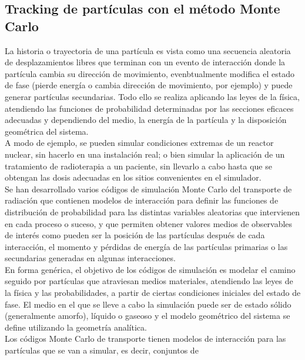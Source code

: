 \subsection{Tracking de part\'iculas con el m\'etodo Monte Carlo}
\label{CapVII_10}

La historia o trayectoria de una part\'icula es vista como una secuencia aleatoria de desplazamientos libres que terminan con un evento
de interacci\'on donde la part\'icula cambia su direcci\'on de movimiento, evenbtualmente modifica el estado de fase (pierde energ\'ia o
cambia direcci\'on de movimiento, por ejemplo) y puede generar part\'iculas secundarias.
%
Todo ello se realiza aplicando las leyes de la f\'isica, atendiendo las funciones de probabilidad determinadas por las secciones eficaces
adecuadas y dependiendo del medio, la energ\'ia de la part\'icula y la disposici\'on geom\'etrica del sistema. \\
%
%
A modo de ejemplo, se pueden simular condiciones extremas de un reactor nuclear, sin hacerlo en una instalaci\'on real; o bien simular la
aplicaci\'on de un tratamiento de radioterapia a un paciente, sin llevarlo a cabo hasta que se obtengan las dosis adecuadas en los sitios
convenientes en el simulador. \\
%
%
Se han desarrollado varios c\'odigos de simulaci\'on Monte Carlo del transporte de radiaci\'on que contienen modelos de interacci\'on para
definir las funciones de distribuci\'on de probabilidad para las distintas variables aleatorias que intervienen en cada proceso o suceso,
y que permiten obtener valores medios de observables de inter\'es como pueden ser la posici\'on de las part\'iculas despu\'es de cada
interacci\'on, el momento y p\'erdidas de energ\'ia de las part\'iculas primarias o las secundarias generadas en algunas interacciones. \\
%
%
En forma gen\'erica, el objetivo de los c\'odigos de simulaci\'on es modelar el camino seguido por part\'iculas que atraviesan medios
materiales, atendiendo las leyes de la f\'isica y las probabilidades, a partir de ciertas condiciones iniciales del estado de fase.
%
El medio en el que se lleve a cabo la simulaci\'on puede ser de estado s\'olido (generalmente amorfo), l\'iquido o gaseoso y el modelo
geom\'etrico del sistema se define utilizando la geometr\'ia anal\'itica. \\
%
%
Los c\'odigos Monte Carlo de transporte tienen modelos de interacci\'on para las part\'iculas que se van a simular, es decir, conjuntos de
